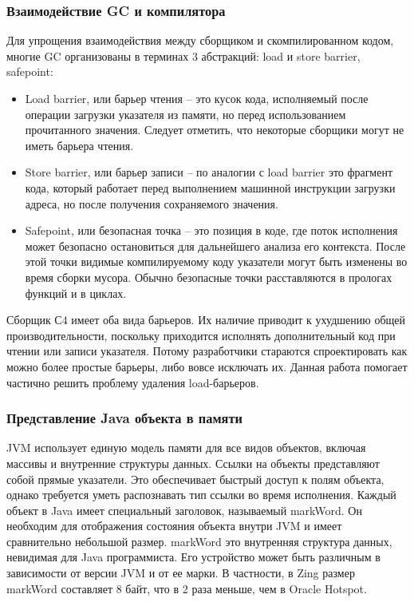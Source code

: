 \subsubsection{Взаимодействие GC и компилятора}
Для упрощения взаимодействия между сборщиком и скомпилированном кодом, многие GC организованы в терминах 3 абстракций: load и store barrier, safepoint\cite{gc-llvm}:
\begin{itemize}
	\item Load barrier, или барьер чтения – это кусок кода, исполняемый после операции загрузки указателя из памяти, но перед использованием прочитанного значения. Следует отметить, что некоторые сборщики могут не иметь барьера чтения.
	\item Store barrier, или барьер записи  – по аналогии с load barrier это фрагмент кода, который работает перед выполнением машинной инструкции загрузки адреса, но после получения сохраняемого значения.
	\item Safepoint, или безопасная точка – это позиция в коде, где поток исполнения может безопасно остановиться для дальнейшего анализа его контекста. После этой точки видимые компилируемому коду указатели могут быть изменены во время сборки мусора\cite{gc-handbook}. 
	Обычно безопасные точки расставляются в прологах функций и в циклах.
\end{itemize}
Сборщик С4 имеет оба вида барьеров. Их наличие приводит к ухудшению общей производительности, поскольку приходится исполнять дополнительный код при чтении или записи указателя. 
Потому разработчики стараются спроектировать как можно более простые барьеры, либо вовсе исключать их. 
Данная работа помогает частично решить проблему удаления load-барьеров.

\subsubsection{Представление Java объекта в памяти}
JVM использует единую модель памяти для все видов объектов, включая массивы и внутренние структуры данных. 
Ссылки на объекты представляют собой прямые указатели. Это обеспечивает быстрый доступ к полям объекта, однако требуется уметь распознавать тип ссылки во время исполнения. 
Каждый объект в Java имеет специальный заголовок, называемый markWord. Он необходим для отображения состояния объекта внутри JVM и имеет сравнительно небольшой размер. 
markWord это внутренняя структура данных, невидимая для Java программиста. Его устройство может быть различным в зависимости от версии JVM и от ее марки. 
В частности, в Zing размер markWord составляет 8 байт, что в 2 раза меньше, чем в Oracle Hotspot. 

